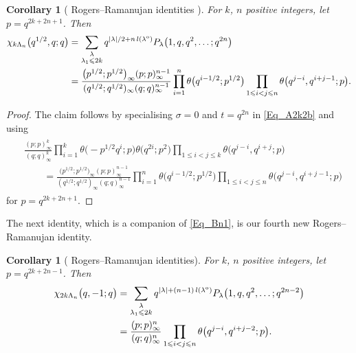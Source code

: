 \documentclass[pdftex]{sigma}
\numberwithin{equation}{section}
\newtheorem{Corollary}[Theorem]{Corollary}
\renewcommand{\leq}{\leqslant}
\newcommand{\abs}[1]{\vert#1\vert}
\newcommand{\la}{\lambda}
\newcommand{\La}{\Lambda}
\begin{document}
\begin{Corollary}[ Rogers--Ramanujan identities
{\cite[Theorem 5.13]{RW21}}]\label{Cor_10}
For $k$, $n$ positive integers, let $p=q^{2k+2n+1}$.
Then
\begin{align*}
\chi_{k\La_n}\bigl(q^{1/2},q;q\bigr)&=
\sum_{\substack{\la \\[1pt] \la_1\leq 2k}}
q^{\abs{\la}/2+n\, l(\la^{\textup{o}})}
P_{\la}\bigl(1,q,q^2,\dots;q^{2n}\bigr) \\
&=\frac{\bigl(p^{1/2};p^{1/2}\bigr)_{\infty}
(p;p)_{\infty}^{n-1}}{(q^{1/2};q^{1/2})_{\infty}(q;q)_{\infty}^{n-1}}
\prod_{i=1}^n \theta\bigl(q^{i-1/2};p^{1/2}\bigr)
\prod_{1\leq i<j\leq n} \theta\bigl(q^{j-i},q^{i+j-1};p\bigr).
\end{align*}
\end{Corollary}

\begin{proof}
The claim follows by specialising $\sigma=0$ and $t=q^{2n}$ in
\eqref{Eq_A2k2b} and using
\begin{align*}
\begin{split}
&\frac{(p;p)_{\infty}^k}{(q;q)_{\infty}^k}
\prod_{i=1}^k \theta\bigl({-}p^{1/2}q^i;p\bigr)
\theta\bigl(q^{2i};p^2\bigr)
\prod_{1\leq i<j\leq k}\theta\bigl(q^{j-i},q^{i+j};p\bigr) \\
&\qquad=\frac{\bigl(p^{1/2};p^{1/2}\bigr)_{\infty}
(p;p)_{\infty}^{n-1}}{(q^{1/2};q^{1/2})_{\infty}(q;q)_{\infty}^{n-1}}
\prod_{i=1}^n \theta\bigl(q^{i-1/2};p^{1/2}\bigr)
\prod_{1\leq i<j\leq n} \theta\bigl(q^{j-i},q^{i+j-1};p\bigr)
\end{split}
\end{align*}
for $p=q^{2k+2n+1}$.
\end{proof}

The next identity, which is a companion of \eqref{Eq_Bn1}, is our fourth
new Rogers--Ramanujan identity.

\begin{Corollary}[ Rogers--Ramanujan identities]
\label{Cor_11}
For $k$, $n$ positive integers, let $p\!=\!q^{2k+2n-1}$.
Then
\begin{align*}
\begin{split}
\chi_{2k\La_n}\bigl(q,-1;q\bigr)&{}=
\sum_{\substack{\la \\[1pt] \la_1\leq 2k}}
q^{\abs{\la}+(n-1)\,l(\la^{\textup{o}})}
P_{\la}\bigl(1,q,q^2,\dots;q^{2n-2}\bigr)\\
&{}=\frac{(p;p)_{\infty}^n}{(q;q)_{\infty}^n}
\prod_{1\leq i<j\leq n} \theta\bigl(q^{j-i},q^{i+j-2};p\bigr).
\end{split}
\end{align*}
\end{Corollary}
\end{document}

